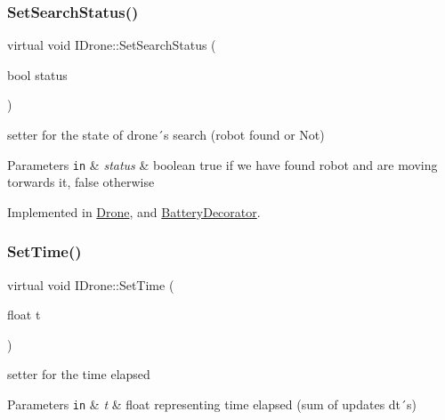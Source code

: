 \mbox{\label{classIDrone_ac6f580814e7091ea64ecf2a7137b8120}} 
\subsubsection{\texorpdfstring{Set\+Search\+Status()}{SetSearchStatus()}}
{\footnotesize\ttfamily virtual void I\+Drone\+::\+Set\+Search\+Status (\begin{DoxyParamCaption}\item[{bool}]{status }\end{DoxyParamCaption})\hspace{0.3cm}{\ttfamily [pure virtual]}}



setter for the state of drone´s search (robot found or Not) 


\begin{DoxyParams}[1]{Parameters}
\mbox{\tt in}  & {\em status} & boolean true if we have found robot and are moving torwards it, false otherwise \\
\hline
\end{DoxyParams}


Implemented in \hyperlink{classDrone_a5349ad4b562b038a2d27ede3ed3fa80d}{Drone}, and \hyperlink{classBatteryDecorator_a41d8c8512cf82484120a9f3f951c4c2b}{Battery\+Decorator}.

\mbox{\label{classIDrone_a0ca36885fd79fbf2efa3909771218d56}} 
\subsubsection{\texorpdfstring{Set\+Time()}{SetTime()}}
{\footnotesize\ttfamily virtual void I\+Drone\+::\+Set\+Time (\begin{DoxyParamCaption}\item[{float}]{t }\end{DoxyParamCaption})\hspace{0.3cm}{\ttfamily [pure virtual]}}



setter for the time elapsed 


\begin{DoxyParams}[1]{Parameters}
\mbox{\tt in}  & {\em t} & float representing time elapsed (sum of updates dt´s) \\
\hline
\end{DoxyParams}



